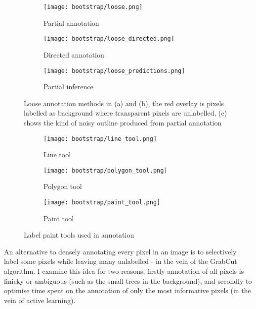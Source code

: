 \begin{figure}[!ht]
\centering
\begin{subfigure}[t]{.33\textwidth}
  \centering
  \texttt{[image: bootstrap/loose.png]}
  \caption{Partial annotation}
  \label{fig:bootstrap_loose_annot}
\end{subfigure}%
\begin{subfigure}[t]{.33\textwidth}
  \centering
  \texttt{[image: bootstrap/loose\_directed.png]}
  \caption{Directed annotation}
  \label{fig:bootstrap_loose_dir}

\end{subfigure}%
\begin{subfigure}[t]{.33\textwidth}
  \centering
  \texttt{[image: bootstrap/loose\_predictions.png]}
  \caption{Partial inference}
  \label{fig:bootstrap_loose_pred}
\end{subfigure}
  \caption{Loose annotation methods in (a) and (b), the red overlay is pixels labelled as background where transparent pixels are unlabelled, (c) shows the kind of noisy outline produced from partial annotation }


\end{figure}

\begin{figure}
\centering
\begin{subfigure}[t]{.33\textwidth}
  \centering
  \texttt{[image: bootstrap/line\_tool.png]}
  \caption{Line tool}
\end{subfigure}%
\begin{subfigure}[t]{.33\textwidth}
  \centering
  \texttt{[image: bootstrap/polygon\_tool.png]}
  \caption{Polygon tool}
\end{subfigure}%
\begin{subfigure}[t]{.33\textwidth}
  \centering
  \texttt{[image: bootstrap/paint\_tool.png]}
  \caption{Paint tool}
\end{subfigure}%

  \caption{Label paint tools used in annotation}
  \label{fig:bootstrap_tools}

\end{figure}



An alternative to densely annotating every pixel in an image is to selectively label some pixels while leaving many unlabelled - in the vein of the GrabCut algorithm. I examine this idea for two reasons, firstly annotation of all pixels is finicky or ambiguous (such as the small trees in the background), and secondly to optimise time spent on the annotation of only the most informative pixels (in the vein of active learning).


